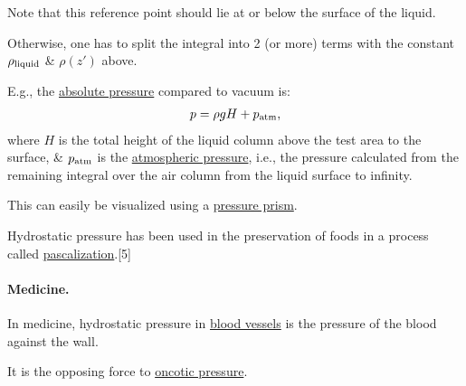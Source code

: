 \documentclass{article}
\begin{document}
Note that this reference point should lie at or below the surface of the liquid.

Otherwise, one has to split the integral into 2 (or more) terms with the constant $\rho_{\rm liquid}$ \& $\rho(z')$ above.

E.g., the \href{https://en.wikipedia.org/wiki/Pressure_measurement#Absolute,_gauge_and_differential_pressures_-_zero_reference}{absolute pressure} compared to vacuum is:
\begin{align*}
	p = \rho gH + p_{\rm atm},
\end{align*}
where $H$ is the total height of the liquid column above the test area to the surface, \& $p_{\rm atm}$ is the \href{https://en.wikipedia.org/wiki/Atmospheric_pressure}{atmospheric pressure}, i.e., the pressure calculated from the remaining integral over the air column from the liquid surface to infinity.

This can easily be visualized using a \href{https://en.wikipedia.org/wiki/Pressure_prism}{pressure prism}.

%
Hydrostatic pressure has been used in the preservation of foods in a process called \href{https://en.wikipedia.org/wiki/Pascalization}{pascalization}.[5]

\paragraph{Medicine.} In medicine, hydrostatic pressure in \href{https://en.wikipedia.org/wiki/Blood_vessel}{blood vessels} is the pressure of the blood against the wall.

It is the opposing force to \href{https://en.wikipedia.org/wiki/Oncotic_pressure}{oncotic pressure}.
\end{document}
